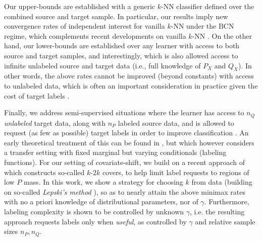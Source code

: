 \documentclass[final,12pt]{colt2018} %
\begin{document}
Our upper-bounds are established with a generic
$k$-NN classifier defined over the combined source and target sample. In particular, our results imply
new convergence rates of independent interest for vanilla $k$-NN under the $\text{BCN}$ regime, which complements recent developments on vanilla $k$-NN \citep{samworth2012optimal, chaudhuri2014rates, shalev2014understanding,gadat2014classification}. On the other hand, our lower-bounds are established over any learner with access to both source and target samples, and interestingly, which is also allowed access to infinite unlabeled source and target data (i.e., full knowledge of $P_X$ and $Q_X$). In other words, the above rates cannot be improved (beyond constants) with access to unlabeled data, which is often an important consideration in practice given the cost of target labels \citep{huang2007correcting, ben2012hardness}.

Finally, we address semi-supervised situations where the learner has access to $n_Q$ \emph{unlabeled} target data, along with $n_P$ labeled source data, and is allowed to request (as few as possible) target labels 
in order to improve classification \citep{saha2011active, chen2011co, pmlr-v28-chattopadhyay13}. An early theoretical treatment of this can be found in \citep{yang2013theory}, but which however considers a transfer setting with fixed marginal but varying conditionals (labeling functions). For our setting of covariate-shift, we build on a recent approach of \cite{berlind2015active} which constructs so-called $k$-$2k$ covers, to help limit label requests to regions of low $P$ mass. In this work, we show a strategy for choosing $k$ from data (building on so-called \emph{Lepski's method} \citep{lepski1997optimal}), so as to nearly attain the above minimax rates with no a priori knowledge of distributional parameters, nor of $\gamma$. Furthermore, labeling complexity is shown to be controlled by unknown $\gamma$, i.e. the resulting approach requests labels only when \emph{useful}, as controlled by $\gamma$ and relative sample sizes $n_P, n_Q$. 




\end{document}
